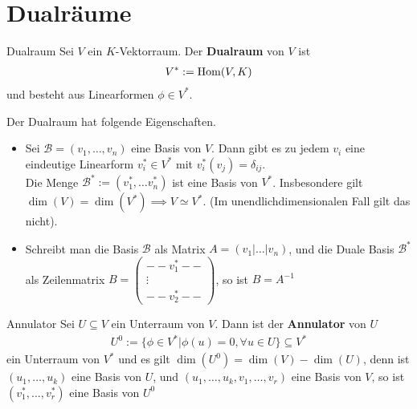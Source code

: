
\section{Dualräume}

\begin{definition}{Dualraum}
    Sei $V$ ein $K$-Vektorraum. Der \textbf{Dualraum} von $V$ ist
    \begin{align*}
        V^{*} := \operatorname{Hom}(V,K)
    \end{align*}
    und besteht aus Linearformen $\phi \in V^*$.
\end{definition}
Der Dualraum hat folgende Eigenschaften.
\begin{itemize}
    \item   
    Sei $\mathcal{B} = (v_{1}, \ldots, v_{n})$ eine Basis von $V$. Dann gibt es zu jedem $v_i$ eine eindeutige Linearform $v_i^{*} \in V^{*}$ mit $v_i^{*}(v_j) = \delta_{ij}$.\\
    Die Menge $\mathcal{B}^{*} := (v_1^{*}, \ldots v_n^{*})$ ist eine Basis von $V^{*}$. Insbesondere gilt $\dim(V) = \dim(V^*) \implies V \simeq V^{*}$. (Im unendlichdimensionalen Fall gilt das nicht).
    \item  Schreibt man die Basis $\mathcal{B}$ als Matrix $A = (v_1|\ldots|v_n)$, und die Duale Basis $\mathcal{B}^*$ als Zeilenmatrix $B = \begin{pmatrix}
        -- v_1^* --\\
        \vdots\\
        -- v_2^* --
    \end{pmatrix}$, so ist $B = {A}^{-1}$
\end{itemize}

\begin{definition}{Annulator}
    Sei $U \subseteq V$ ein Unterraum von $V$. Dann ist der \textbf{Annulator} von $U$ 
    \begin{align*}
        U^0 := \{\phi \in V^* \big\vert \phi(u) = 0, \forall u \in U\} \subseteq V^*
    \end{align*}
    ein Unterraum von $V^*$ und es gilt $\dim(U^0) = \dim(V) - \dim(U)$, denn ist $(u_{1}, \ldots, u_{k})$ eine Basis von $U$, und $(u_{1}, \ldots, u_{k}, v_{1}, \ldots, v_{r})$ eine Basis von $V$, so ist $(v_{1}^*, \ldots, v_{r}^*)$ eine Basis von $U^0$
\end{definition}

